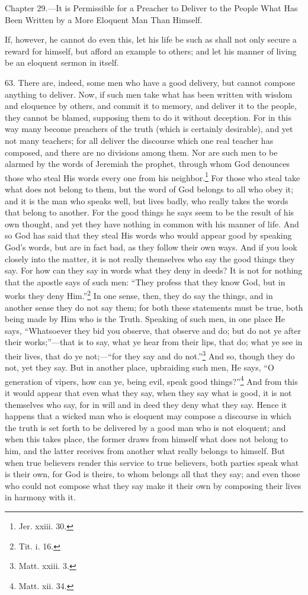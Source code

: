 Chapter 29.—It is Permissible for a Preacher to Deliver to the People What Has Been Written by a More Eloquent Man Than Himself.

If, however, he cannot do even this, let his life be such as shall not only secure a reward for himself, but afford an example to others; and let his manner of living be an eloquent sermon in itself.

63. There are, indeed, some men who have a good delivery, but cannot compose anything to deliver. Now, if such men take what has been written with wisdom and eloquence by others, and commit it to memory, and deliver it to the people, they cannot be blamed, supposing them to do it without deception. For in this way many become preachers of the truth (which is certainly desirable), and yet not many teachers; for all deliver the discourse which one real teacher has composed, and there are no divisions among them. Nor are such men to be alarmed by the words of Jeremiah the prophet, through whom God denounces those who steal His words every one from his neighbor.\footnote{Jer. xxiii. 30.} For those who steal take what does not belong to them, but the word of God belongs to all who obey it; and it is the man who speaks well, but lives badly, who really takes the words that belong to another. For the good things he says seem to be the result of his own thought, and yet they have nothing in common with his manner of life. And so God has said that they steal His words who would appear good by speaking God’s words, but are in fact bad, as they follow their own ways. And if you look closely into the matter, it is not really themselves who say the good things they say. For how can they say in words what they deny in deeds? It is not for nothing that the apostle says of such men: “They profess that they know God, but in works they deny Him.”\footnote{Tit. i. 16.} In one sense, then, they do say the things, and in another sense they do not say them; for both these statements must be true, both being made by Him who is the Truth. Speaking of such men, in one place He says, “Whatsoever they bid you observe, that observe and do; but do not ye after their works;”—that is to say, what ye hear from their lips, that do; what ye see in their lives, that do ye not;—“for they say and do not.”\footnote{Matt. xxiii. 3.} And so, though they do not, yet they say. But in another place, upbraiding such men, He says, “O generation of vipers, how can ye, being evil, speak good things?”\footnote{Matt. xii. 34.} And from this it would appear that even what they say, when they say what is good, it is not themselves who say, for in will and in deed they deny what they say. Hence it happens that a wicked man who is eloquent may compose a discourse in which the truth is set forth to be delivered by a good man who is not eloquent; and when this takes place, the former draws from himself what does not belong to him, and the latter receives from another what really belongs to himself. But when true believers render this service to true believers, both parties speak what is their own, for God is theirs, to whom belongs all that they say; and even those who could not compose what they say make it their own by composing their lives in harmony with it.

